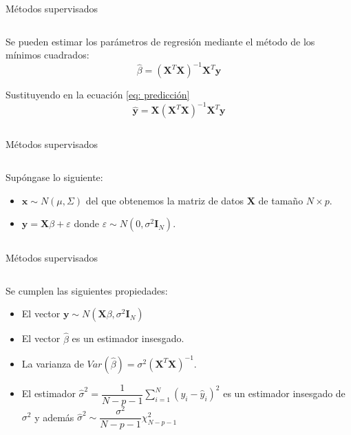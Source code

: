 \begin{frame}{Métodos supervisados}
\begin{columns}
\begin{column}{0.9\textwidth}
Se pueden estimar los parámetros de regresión mediante el método de los mínimos cuadrados:
\begin{equation}
\hat{\beta}=(\mathbf{X}^T\mathbf{X})^{-1}\mathbf{X}^T \mathbf{y}
\end{equation}

Sustituyendo en la ecuación \ref{eq: predicción}
\begin{equation}
\mathbf{\hat{y}}= \mathbf{X}(\mathbf{X}^T\mathbf{X})^{-1}\mathbf{X}^T \mathbf{y}
\end{equation}

\end{column}
\end{columns}
\end{frame}




\begin{frame}{Métodos supervisados}
\begin{columns}
\begin{column}{0.9\textwidth}

Supóngase lo siguiente: 
\begin{itemize}
\item $\mathbf{x}\sim N(\mu,\Sigma)$ del que obtenemos la matriz de datos $\mathbf{X}$ de tamaño $N\times p$. 
\item $\mathbf{y}=\mathbf{X}\beta+\varepsilon$ donde $\varepsilon\sim N(0,\sigma^2\mathbf{I}_N)$.
\end{itemize}
\end{column}
\end{columns}
\end{frame}



\begin{frame}{Métodos supervisados}
\begin{columns}
\begin{column}{0.9\textwidth}
Se cumplen las siguientes propiedades: 
\begin{itemize}
\item El vector $\mathbf{y}\sim N(\mathbf{X}\beta,\sigma^2\mathbf{I}_N)$
\item El vector $\hat{\beta}$ es un estimador insesgado.
\item La varianza de $Var(\hat{\beta})=\sigma^2(\mathbf{X}^T\mathbf{X})^{-1}$.
\item El estimador $\displaystyle\hat{\sigma}^2=\dfrac{1}{N-p-1}\sum_{i=1}^N(y_i-\hat{y}_i)^2$ es un estimador insesgado de $\sigma^2$ y además $\displaystyle\hat{\sigma}^2\sim \dfrac{\sigma^2}{N-p-1}\chi_{N-p-1}^2$
\end{itemize}

\end{column}
\end{columns}
\end{frame}

